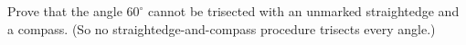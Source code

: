 Prove that the angle $60^\circ$ cannot be trisected with an unmarked straightedge and a compass. (So no straightedge-and-compass procedure trisects every angle.)
